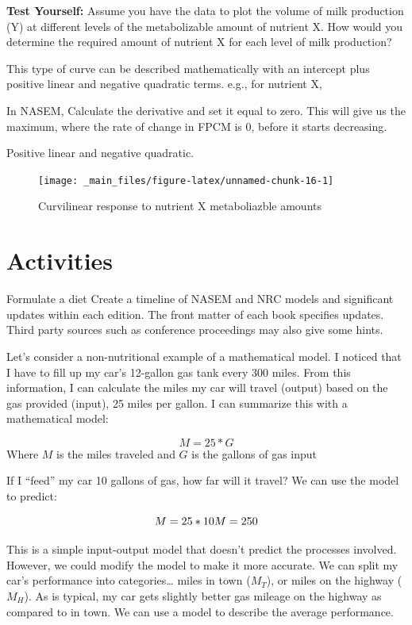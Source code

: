 \documentclass[
]{book}
\begin{document}
\textbf{Test Yourself: }
Assume you have the data to plot the volume of milk production (Y) at different levels of the metabolizable amount of nutrient X. How would you determine the required amount of nutrient X for each level of milk production?

This type of curve can be described mathematically with an intercept plus positive linear and negative quadratic terms. e.g., for nutrient X,

In NASEM,
Calculate the derivative and set it equal to zero. This will give us the maximum, where the rate of change in FPCM is 0, before it starts decreasing.

Positive linear and negative quadratic.

\begin{figure}

{\centering \texttt{[image: \_main\_files/figure-latex/unnamed-chunk-16-1]} 

}

\caption{Curvilinear response to nutrient X metaboliazble amounts}\label{fig:unnamed-chunk-16}
\end{figure}

\hypertarget{activities}{%
\section{Activities}\label{activities}}

Formulate a diet
Create a timeline of NASEM and NRC models and significant updates within each edition. The front matter of each book specifies updates. Third party sources such as conference proceedings may also give some hints.

Let's consider a non-nutritional example of a mathematical model. I noticed that I have to fill up my car's 12-gallon gas tank every 300 miles. From this information, I can calculate the miles my car will travel (output) based on the gas provided (input), 25 miles per gallon. I can summarize this with a mathematical model:

\[M = 25*G\]
Where \(M\) is the miles traveled
and \(G\) is the gallons of gas input

If I ``feed'' my car 10 gallons of gas, how far will it travel? We can use the model to predict:

\[ M = 25 * 10 \\
M = 250
\]

This is a simple input-output model that doesn't predict the processes involved. However, we could modify the model to make it more accurate. We can split my car's performance into categories\ldots{} miles in town (\(M_T\)), or miles on the highway (\(M_H\)). As is typical, my car gets slightly better gas mileage on the highway as compared to in town. We can use a model to describe the average performance.
\end{document}
